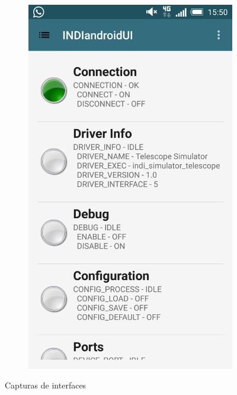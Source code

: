 \begin{figure}
\begin{subfigure}[]{0.45\textwidth}
        \includegraphics[width=\textwidth]{../images/captura2.png}
        \caption{}
        \label{fig:captura2}
    \end{subfigure}
    \caption{Capturas de interfaces}\label{fig:capturas}
\end{figure}

